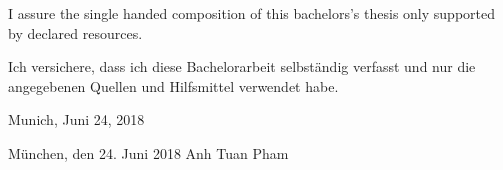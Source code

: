 \cleardoublepage



\vspace*{0.7\textheight}
\noindent I assure the single handed composition of this bachelors's thesis only supported by declared resources.

\vspace{7mm}

\noindent Ich versichere, dass ich diese Bachelorarbeit selbst\"andig verfasst und nur die angegebenen Quellen und Hilfsmittel verwendet habe.

\vspace{12mm}

\noindent Munich, Juni 24, 2018

\vspace{7mm}

\noindent M\"unchen, den 24. Juni 2018 \hspace{3cm}  Anh Tuan Pham
\newpage
{}